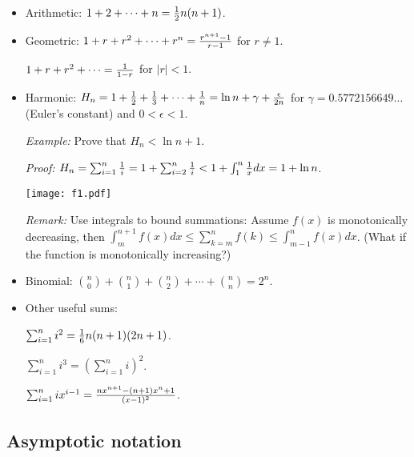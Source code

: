 \documentclass{article}
\begin{document}
\begin{itemize}

\item Arithmetic: $1+2+\cdots+n={1\over2}n(n+1)$.

\item Geometric: $1+r+r^2+\cdots+r^n={{r^{n+1}-1}\over{r-1}}$ for
$r\not=1$.

$1+r+r^2+\cdots={1\over{1-r}}$ for $|r|<1$.

\item Harmonic: $H_n=1+{1\over2}+{1\over3}+\cdots+{1\over n}
=\ln n+\gamma+{\epsilon\over{2n}}$ for $\gamma=0.5772156649\ldots$
(Euler's constant) and $0<\epsilon<1$.

{\em Example:} Prove that $H_n<\ln n+1$.

{\em Proof:} $H_n=\sum_{i=1}^n{1\over i}=1+\sum_{i=2}^n{1\over i}
<1+\int_1^n {1\over x}dx=1+\ln n$.

\vskip 0.25cm
\begin{center}
\texttt{[image: f1.pdf]}
\end{center}

{\em Remark:} Use integrals to bound summations:
Assume $f(x)$ is monotonically decreasing, then
$\int_m^{n+1} f(x)dx\le \sum_{k=m}^nf(k)\le\int_{m-1}^nf(x)dx$.
(What if the function is monotonically increasing?)

\item Binomial: ${n\choose 0}+{n\choose 1}+{n\choose 2}+
\cdots+{n\choose n}=2^n$.

\item Other useful sums:

$\sum_{i=1}^n i^2={1\over6}n(n+1)(2n+1)$.

$\sum_{i=1}^n i^3=(\sum_{i=1}^n i)^2$.

$\sum_{i=1}^n ix^{i-1}={{nx^{n+1}-(n+1)x^n+1}\over{(x-1)^2}}$.

\end{itemize}

\subsection{Asymptotic notation}

\end{document}
